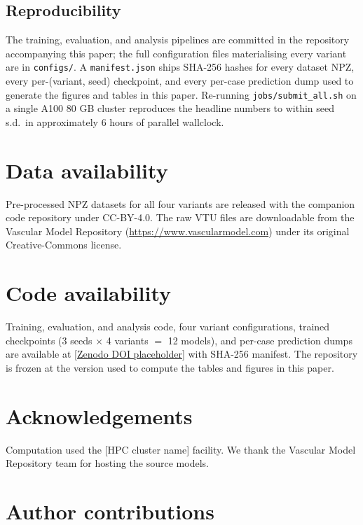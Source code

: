 \documentclass[10pt,a4paper]{article}
\begin{document}
\subsection*{Reproducibility}

The training, evaluation, and analysis pipelines are committed in the
repository accompanying this paper; the full configuration files
materialising every variant are in \texttt{configs/}. A
\texttt{manifest.json} ships SHA-256 hashes for every dataset NPZ,
every per-(variant, seed) checkpoint, and every per-case prediction
dump used to generate the figures and tables in this paper. Re-running
\texttt{jobs/submit\_all.sh} on a single A100 80 GB cluster reproduces
the headline numbers to within seed s.d.\ in approximately $6$ hours
of parallel wallclock.

\section*{Data availability}

Pre-processed NPZ datasets for all four variants are released with the
companion code repository under CC-BY-4.0. The raw VTU files are
downloadable from the Vascular Model Repository
(\url{https://www.vascularmodel.com}) under its original
Creative-Commons license.

\section*{Code availability}

Training, evaluation, and analysis code, four variant configurations,
trained checkpoints (3 seeds $\times$ 4 variants $=$ 12 models), and
per-case prediction dumps are available at
\href{https://github.com/}{[Zenodo DOI placeholder]} with SHA-256
manifest. The repository is frozen at the version used to compute the
tables and figures in this paper.

\section*{Acknowledgements}

Computation used the [HPC cluster name] facility. We thank the
Vascular Model Repository team for hosting the source models.

\section*{Author contributions}
\end{document}
